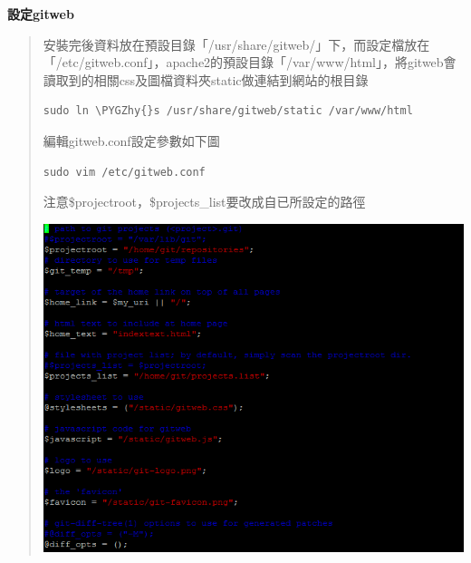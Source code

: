 \documentclass[letterpaper,10pt,english]{sphinxmanual}
\def\PYGZhy{\char`\-}
\begin{document}
\textbf{設定gitweb}
\begin{quote}

安裝完後資料放在預設目錄「/usr/share/gitweb/」下，而設定檔放在「/etc/gitweb.conf」，apache2的預設目錄「/var/www/html」，將gitweb會讀取到的相關css及圖檔資料夾static做連結到網站的根目錄

\begin{Verbatim}[commandchars=\\\{\}]
sudo ln \PYGZhy{}s /usr/share/gitweb/static /var/www/html
\end{Verbatim}

編輯gitweb.conf設定參數如下圖

\begin{Verbatim}[commandchars=\\\{\}]
sudo vim /etc/gitweb.conf
\end{Verbatim}

注意\$projectroot，\$projects\_list要改成自已所設定的路徑

\includegraphics{gitolite3-gitweb-1.png}
\end{quote}
\end{document}
